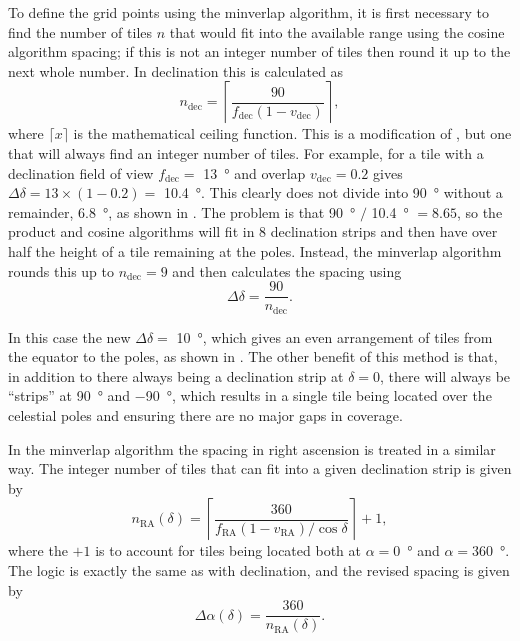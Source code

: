 \begin{colsection}
\clearpage

To define the grid points using the minverlap algorithm, it is first necessary to find the number of tiles $n$ that would fit into the available range using the cosine algorithm spacing; if this is not an integer number of tiles then round it up to the next whole number. In declination this is calculated as
%
\begin{equation}
    n_\text{dec} = \left \lceil \frac{90}{f_\text{dec}(1-v_\text{dec})} \right \rceil,
    \label{eq:minverlap_ndec}
\end{equation}
%
where $\lceil x \rceil$ is the mathematical ceiling function. This is a modification of , but one that will always find an integer number of tiles. For example, for a tile with a declination field of view $f_\text{dec} = $ \SI{13}{\degree} and overlap $v_\text{dec} = 0.2$  gives $\Delta\delta = 13 \times (1-0.2) = $ \SI{10.4}{\degree}. This clearly does not divide into \SI{90}{\degree} without a remainder, \SI{6.8}{\degree}, as shown in . The problem is that \SI{90}{\degree} $/$ \SI{10.4}{\degree} $= 8.65$, so the product and cosine algorithms will fit in 8 declination strips and then have over half the height of a tile remaining at the poles. Instead, the minverlap algorithm rounds this up to $n_\text{dec} = 9$ and then calculates the spacing using
%
\begin{equation}
    \Delta\delta = \frac{90}{n_\text{dec}}.
    \label{eq:minverlap_deltadelta}
\end{equation}

In this case the new $\Delta\delta = $ \SI{10}{\degree}, which gives an even arrangement of tiles from the equator to the poles, as shown in . The other benefit of this method is that, in addition to there always being a declination strip at $\delta=0$, there will always be ``strips'' at \SI{+90}{\degree} and \SI{-90}{\degree}, which results in a single tile being located over the celestial poles and ensuring there are no major gaps in coverage.

In the minverlap algorithm the spacing in right ascension is treated in a similar way. The integer number of tiles that can fit into a given declination strip is given by
%
\begin{equation}
    n_\text{RA}(\delta) = \left \lceil \frac{360}{f_\text{RA}(1-v_\text{RA})/\cos \delta} \right \rceil + 1,
    \label{eq:minverlap_nra}
\end{equation}
%
where the $+1$ is to account for tiles being located both at $\alpha=$\SI{0}{\degree} and $\alpha=$\SI{360}{\degree}. The logic is exactly the same as with declination, and the revised spacing is given by
%
\begin{equation}
    \Delta\alpha(\delta) = \frac{360}{n_\text{RA}(\delta)}.
    \label{eq:minverlap_deltaalpha}
\end{equation}


\end{colsection}
